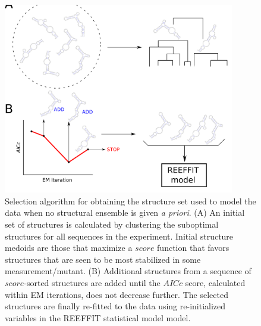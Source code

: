 \documentclass[12pt]{article}
\begin{document}
\begin{figure}[here]
\includegraphics[width=0.9\textwidth]{figures/structselect.png}
\caption{Selection algorithm for obtaining the structure set used to model the data when no structural ensemble is given \textit{a priori}. (A) An initial set of structures is calculated by clustering the suboptimal structures for all sequences in the experiment. Initial structure medoids are those that maximize a $score$ function that favors structures that are seen to be most stabilized in some measurement/mutant. (B) Additional structures from a sequence of $score$-sorted structures are added until the $AICc$ score, calculated within EM iterations, does not decrease further. The selected structures are finally re-fitted to the data using re-initialized variables in the REEFFIT statistical model model.}
\label{fig:structselectfig}
\end{figure}
\end{document}
